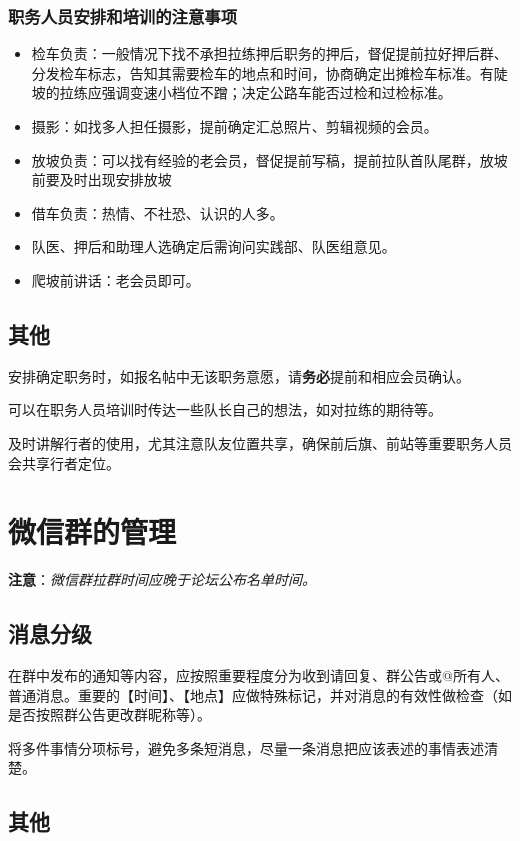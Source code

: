 \documentclass[UTF8]{ctexart}
\begin{document}
\subsubsection{职务人员安排和培训的注意事项}

\begin{itemize}[nosep,left=2em]
    \item 检车负责：一般情况下找不承担拉练押后职务的押后，督促提前拉好押后群、分发检车标志，告知其需要检车的地点和时间，协商确定出摊检车标准。有陡坡的拉练应强调变速小档位不蹭；决定公路车能否过检和过检标准。
    \item 摄影：如找多人担任摄影，提前确定汇总照片、剪辑视频的会员。
    \item 放坡负责：可以找有经验的老会员，督促提前写稿，提前拉队首队尾群，放坡前要及时出现安排放坡
    \item 借车负责：热情、不社恐、认识的人多。
    \item 队医、押后和助理人选确定后需询问实践部、队医组意见。
    \item 爬坡前讲话：老会员即可。
\end{itemize}

\subsection{其他}

安排确定职务时，如报名帖中无该职务意愿，请\textbf{务必}提前和相应会员确认。

可以在职务人员培训时传达一些队长自己的想法，如对拉练的期待等。

及时讲解行者的使用，尤其注意队友位置共享，确保前后旗、前站等重要职务人员会共享行者定位。

\section{微信群的管理}
\textbf{注意}：\textit{微信群拉群时间应晚于论坛公布名单时间。}

\subsection{消息分级}

在群中发布的通知等内容，应按照重要程度分为收到请回复、群公告或@所有人、普通消息。重要的【时间】、【地点】应做特殊标记，并对消息的有效性做检查（如是否按照群公告更改群昵称等）。

将多件事情分项标号，避免多条短消息，尽量一条消息把应该表述的事情表述清楚。

\subsection{其他}
\end{document}
